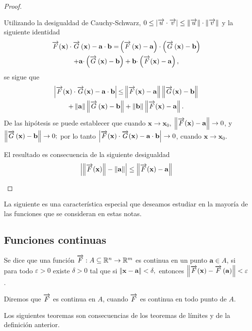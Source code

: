 \begin{proof}
\begin{parrafonumerado}
  \item Utilizando la desigualdad de Cauchy-Schwarz,
    $0\leq \left\vert \overrightarrow{u}\cdot \overrightarrow{v}\right\vert \leq \left\Vert
    \overrightarrow{u}\right\Vert \cdot \left\Vert \overrightarrow{v}\right\Vert $
    y la siguiente identidad
    \begin{multline*}
      \overrightarrow{F}(\mathbf{x}) \cdot \overrightarrow{G}\left( \mathbf{x}\right) -\mathbf{a\cdot b=}\left( \overrightarrow{F}\left( \mathbf{x}\right) -\mathbf{a}\right) \cdot \left( \overrightarrow{G}\left( \mathbf{x} \right) -\mathbf{b}\right) \\
      +\mathbf{a\cdot }\left( \overrightarrow{G}\left( \mathbf{x}\right) -\mathbf{b}\right) +\mathbf{b\cdot }\left( \overrightarrow{F}(\mathbf{x}) -\mathbf{a}\right),
    \end{multline*}
    se sigue que
    \begin{multline*}
      \left\vert \ve{F}(\mathbf{x}) \cdot \ve{G}(\mathbf{x}) -\mathbf{a\cdot b}\right\vert \mathbf{\leq }%
      \left\Vert \ve{F}(\mathbf{x}) -\mathbf{a}\right\Vert \left\Vert \ve{G}(\mathbf{x}) -\mathbf{b}\right\Vert \\
      +\left\Vert \mathbf{a}\right\Vert \left\Vert \ve{G}\left( \mathbf{x}\right) -\mathbf{b}\right\Vert +\left\Vert \mathbf{b}\right\Vert \left\Vert \ve{F}(\mathbf{x}) -\mathbf{a}\right\Vert.
    \end{multline*}
    De las hipótesis se puede establecer que cuando $\mathbf{x\to x }_{0}$,
    $\left\Vert \overrightarrow{F}(\mathbf{x}) -\mathbf{a} \right\Vert \to 0$,
    y $\left\Vert \overrightarrow{G}\left( \mathbf{x} \right) -\mathbf{b}\right\Vert \to 0;$
    por lo tanto
    $\left\vert \overrightarrow{F}(\mathbf{x}) \cdot \overrightarrow{G}(\mathbf{x}) -\mathbf{a\cdot b}\right\vert \to 0$,
    cuando $\mathbf{x\to x}_{0}$.
  \item El resultado es consecuencia de la siguiente desigualdad
    $$\left\vert \left\Vert \overrightarrow{F}(\mathbf{x})\right\Vert -\left\Vert \mathbf{a}\right\Vert \right\vert \leq \left\Vert
    \overrightarrow{F}(\mathbf{x}) -\mathbf{a}\right\Vert $$
  \end{parrafonumerado}
\end{proof}

La siguiente es una característica especial que deseamos estudiar en la mayoría de las funciones que se consideran
en estas notas.

\subsection{Funciones continuas}
\begin{defi} 
  Se dice que una función $\overrightarrow{F}:A\subseteq \mathbb{R}^n\to \mathbb{R}^m$ es continua en un punto
  $\mathbf{a}\in A$, si para todo $\varepsilon >0$ existe $\delta >0$ tal que si
  $\left\Vert \mathbf{x}-\mathbf{a}\right\Vert <\delta, $ entonces
  $\left\Vert \overrightarrow{F}(\mathbf{x}) -\overrightarrow{F}\left( \mathbf{a}\right) \right\Vert <\varepsilon $.

  Diremos que $\overrightarrow{F}$ es continua en $A$, cuando $\overrightarrow{F}$ es continua en todo punto de $A$.
\end{defi}
Los siguientes teoremas son consecuencias de los teoremas de límites y de la definición anterior.

